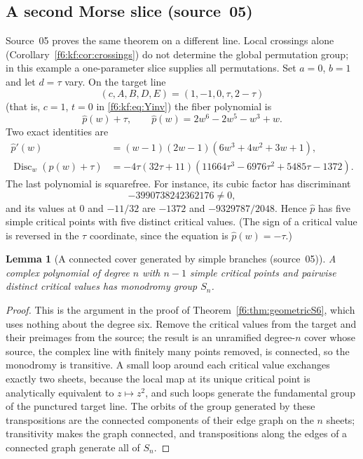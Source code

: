 \documentclass[11pt,a4paper]{article}
\newtheorem{lemma}[theorem]{Lemma}
\theoremstyle{definition}
\newcommand{\Disc}{\operatorname{Disc}}
\newcommand{\src}[1]{\textup{(source~#1)}}
\begin{document}
\subsection{A second Morse slice \src{05}}
Source~05 proves the same theorem on a different line. Local crossings alone
(Corollary~\ref{f6:kf:cor:crossings}) do not determine the global permutation
group; in this example a one-parameter slice supplies all permutations. Set
$a=0$, $b=1$ and let $d=\tau$ vary. On the target line
\begin{equation}\label{f6:kf:eq:line}
(c,A,B,D,E)=(1,-1,0,\tau,2-\tau)
\end{equation}
(that is, $c=1$, $t=0$ in \eqref{f6:kf:eq:Yinv}) the fiber polynomial is
\begin{equation}\label{f6:kf:eq:P}
\hat p(w)+\tau,\qquad \hat p(w)=2w^6-2w^5-w^3+w .
\end{equation}
Two exact identities are
\begin{align}
\hat p'(w)&=(w-1)(2w-1)(6w^3+4w^2+3w+1),\label{f6:kf:eq:Pprime}\\
\Disc_w(\hat p(w)+\tau)&=-4\tau(32\tau+11)
 (11664\tau^3-6976\tau^2+5485\tau-1372).\label{f6:kf:eq:criticalvalues}
\end{align}
The last polynomial is squarefree. For instance, its cubic factor has
discriminant
\[
-3990738242362176\ne0,
\]
and its values at $0$ and $-11/32$ are $-1372$ and $-9329787/2048$. Hence $\hat p$ has five simple critical points
with five distinct critical values. (The sign of a critical value is reversed
in the $\tau$ coordinate, since the equation is $\hat p(w)=-\tau$.)

\begin{lemma}[A connected cover generated by simple branches \src{05}]
\label{f6:kf:lem:transpositiongraph}
A complex polynomial of degree $n$ with $n-1$ simple critical points and
pairwise distinct critical values has monodromy group $S_n$.
\end{lemma}
\begin{proof}
This is the argument in the proof of Theorem~\ref{f6:thm:geometricS6}, which
uses nothing about the degree six. Remove the critical values from the target
and their preimages from the source; the result is an unramified
degree-$n$ cover whose source, the complex line with finitely many points
removed, is connected, so the monodromy is transitive. A small loop around
each critical value exchanges exactly two sheets, because the local map at
its unique critical point is analytically equivalent to $z\mapsto z^2$, and
such loops generate the fundamental group of the punctured target line. The
orbits of the group generated by these transpositions are the connected
components of their edge graph on the $n$ sheets; transitivity makes the
graph connected, and transpositions along the edges of a connected graph
generate all of $S_n$.
\end{proof}
\end{document}
